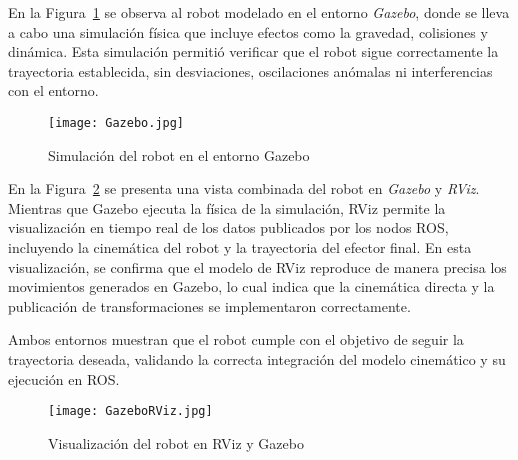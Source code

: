 En la Figura~\ref{fig:simulacion_gazebo} se observa al robot modelado en el entorno \textit{Gazebo}, donde se lleva a cabo una simulación física que incluye efectos como la gravedad, colisiones y dinámica. Esta simulación permitió verificar que el robot sigue correctamente la trayectoria establecida, sin desviaciones, oscilaciones anómalas ni interferencias con el entorno.

\begin{figure}[H]
	\centering
	\texttt{[image: Gazebo.jpg]}
	\caption{Simulación del robot en el entorno Gazebo}
	\label{fig:simulacion_gazebo}
\end{figure}

En la Figura~\ref{fig:GazeboYrviz} se presenta una vista combinada del robot en \textit{Gazebo} y \textit{RViz}. Mientras que Gazebo ejecuta la física de la simulación, RViz permite la visualización en tiempo real de los datos publicados por los nodos ROS, incluyendo la cinemática del robot y la trayectoria del efector final. En esta visualización, se confirma que el modelo de RViz reproduce de manera precisa los movimientos generados en Gazebo, lo cual indica que la cinemática directa y la publicación de transformaciones se implementaron correctamente.

Ambos entornos muestran que el robot cumple con el objetivo de seguir la trayectoria deseada, validando la correcta integración del modelo cinemático y su ejecución en ROS.


\begin{figure}[H]
	\centering
	\texttt{[image: GazeboRViz.jpg]}
	\caption{Visualización del robot en RViz y Gazebo}
	\label{fig:GazeboYrviz}
\end{figure}
